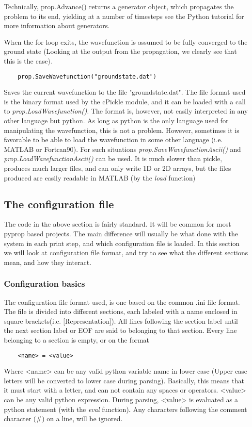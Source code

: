 Technically, prop.Advance() returns a generator object, which propagates the problem to its end, yielding at a number of 
timesteps see the Python tutorial \cite{pythonTut} for more information about generators.

When the for loop exits, the wavefunction is assumed to be fully converged to the ground state (Looking at the output
from the propagation, we clearly see that this is the case). 
\begin{verbatim}	
	prop.SaveWavefunction("groundstate.dat")
\end{verbatim}
Saves the current wavefunction to the file "groundstate.dat". The file format used is the binary format used
by the cPickle module, and it can be loaded with a call to \textit{prop.LoadWavefunction()}. The format is, however, not 
easily interpreted in any other language but python. As long as python is the only language used for manipulating the 
wavefunction, this is not a problem. However, sometimes it is favorable to be able to load the wavefunction in some
other language (i.e. MATLAB or Fortran90). For such situations \textit{prop.SaveWavefunctionAscii()} and
\textit{prop.LoadWavefunctionAscii()}
can be used. It is much slower than pickle, produces much larger files, and can only write 1D or 2D arrays, but the files
produced are easily readable in MATLAB (by the \textit{load} function)

\subsection{The configuration file}
The code in the above section is fairly standard. It will be common for most pyprop based projects. The main difference
will usually be what done with the system in each print step, and which configuration file is loaded. In this section we 
will look at configuration file format, and try to see what the different sections mean, and how they interact.

\subsubsection*{Configuration basics}
The configuration file format used, is one based on the common .ini file format. The file is divided into different
sections, each labeled with a name enclosed in square brackets(i.e. [Representation]). All lines following the section
label until the next section label or EOF are said to belonging to that section. Every line belonging to a section is
empty, or on the format 
\begin{verbatim}
	<name> = <value>
\end{verbatim}
Where <name> can be any valid python variable name in lower case (Upper case letters will be converted to lower case during
parsing). Basically, this means that it must start with a letter, and can not contain any spaces or operators. 
<value> can be any valid python expression. During parsing, <value> is evaluated as a python statement 
(with the \textit{eval} function). Any characters following the comment character (\#) on a line, will be ignored.

